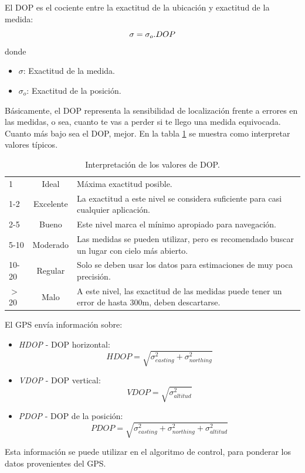 El DOP es el cociente entre la exactitud de la ubicación y exactitud de la medida\cite{bib:sat-pos}:
\begin{equation*}
  \sigma = \sigma_o.DOP
\vspace{-10pt}
\end{equation*}
donde
\begin{itemize}
\item $\sigma$: Exactitud de la medida.
\item $\sigma_o$: Exactitud de la posición. 
\end{itemize}

 Básicamente, el DOP representa la sensibilidad de localización frente a errores en las medidas, o sea, cuanto te vas a perder si te llego una medida equivocada. Cuanto más bajo sea el DOP, mejor. En la tabla \ref{tab:dop} se muestra como interpretar valores típicos\cite{bib:sat-dop-values}.

\begin{table}[H]
\begin{center}
\begin{tabular}{|l|c||p{7cm}|}
\hline
\rowcolor[gray]{0.9}
1 & Ideal & Máxima exactitud posible.\\
\rowcolor[gray]{0.95}
1-2 & Excelente & La exactitud a este nivel se considera suficiente para casi cualquier aplicación.\\
\rowcolor[gray]{0.9}
2-5 & Bueno & Este nivel marca el mínimo apropiado para navegación. \\
\rowcolor[gray]{0.95}
5-10 & Moderado & Las medidas se pueden utilizar, pero es recomendado buscar un lugar con cielo más abierto. \\
\rowcolor[gray]{0.9}
10-20 & Regular & Solo se deben usar los datos para estimaciones de muy poca precisión. \\
\rowcolor[gray]{0.95}
$>$20 & Malo & A este nivel, las exactitud de las medidas puede tener un error de hasta 300m, deben descartarse. \\
\hline
\end{tabular}
\caption{Interpretación de los valores de DOP.}
\label{tab:dop}
\end{center}
\end{table}

El GPS envía información sobre:
\begin{itemize}
\item \textit{HDOP} - DOP horizontal:
  \begin{equation}
    \label{eq:hdop}
    HDOP = \sqrt{\sigma_{easting}^2+\sigma_{northing}^2}    
  \end{equation}
\item \textit{VDOP} - DOP vertical:
  \begin{equation}
    \label{eq:vdop}
    VDOP = \sqrt{\sigma_{altitud}^2}
  \end{equation}
\item \textit{PDOP} - DOP de la posición:
  \begin{equation}
    \label{eq:pdop}
    PDOP = \sqrt{\sigma_{easting}^2+\sigma_{northing}^2 + \sigma_{altitud}^2}
  \end{equation}
\end{itemize}

Esta información se puede utilizar en el algoritmo de control, para ponderar los datos provenientes del GPS.
